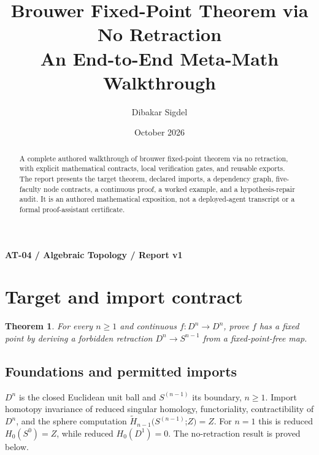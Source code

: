 \documentclass[preprint,12pt,aps,pra,showkeys,amsmath,amssymb,superscriptaddress,floatfix]{revtex4-2}
\newtheorem{theorem}{Theorem}[section]
\theoremstyle{definition}
\theoremstyle{remark}
\begin{document}
\title{Brouwer Fixed-Point Theorem via No Retraction\\[4pt]\large An End-to-End Meta-Math Walkthrough}

\author{Dibakar Sigdel}


\date{October 2026}

\begin{abstract}

A complete authored walkthrough of brouwer fixed-point theorem via no
retraction, with explicit mathematical contracts, local verification
gates, and reusable exports. The report presents the target theorem,
declared imports, a dependency graph, five-faculty node contracts, a
continuous proof, a worked example, and a hypothesis-repair audit. It is
an authored mathematical exposition, not a deployed-agent transcript or
a formal proof-assistant certificate.

\end{abstract}\maketitle\linespread{1.12}\selectfont

\noindent\textbf{AT-04 / Algebraic Topology / Report v1}

\section{Target and import contract}

\begin{theorem}

For every \(n\ge1\) and continuous \(f:D^n\to D^n\), prove \(f\) has a
fixed point by deriving a forbidden retraction \(D^n\to S^{n-1}\) from a
fixed-point-free map.

\end{theorem}

\subsection{Foundations and permitted imports}

\(D^{n}\) is the closed Euclidean unit ball and \(S^{(n-1)}\) its
boundary, \(n\ge 1\). Import homotopy invariance of reduced singular
homology, functoriality, contractibility of \(D^{n}\), and the sphere
computation \(\widetilde H_{n-1}(S^{(n-1)}\);\(Z)=Z\). For \(n=1\) this
is reduced \(H_{0}(S^{0})=Z\), while reduced \(H_{0}(D^{1})=0\). The
no-retraction result is proved below.
\end{document}
